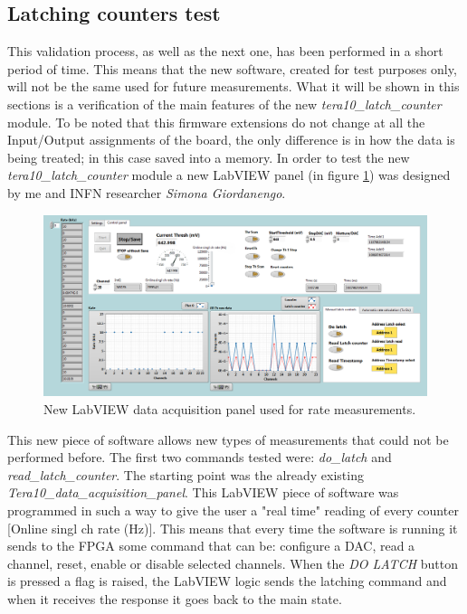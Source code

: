 \subsection{Latching counters test}\label{latchtests}
This validation process, as well as the next one, has been performed in a short period of time. This means that the new software, created for test purposes only, will not be the same used for future measurements. What it will be shown in this sections is a verification of the main features of the new \textit{tera10\_latch\_counter} module.
\newline
To be noted that this firmware extensions do not change at all the Input/Output assignments of the board, the only difference is in how the data is being treated; in this case saved into a memory.
In order to test the new \textit{tera10\_latch\_counter} module a new LabVIEW panel (in figure \ref{fig:newlabviewpanel}) was designed by me and INFN researcher \textit{Simona Giordanengo}.
\begin{figure}[H]
	\centering
	\includegraphics[width=0.99\linewidth]{IMG/ch5/latch_tests/fig1.PNG}
	\caption{New LabVIEW data acquisition panel used for rate measurements.}
	\label{fig:newlabviewpanel}
\end{figure}
\noindent This new piece of software allows new types of measurements that could not be performed before.
The first two commands tested were: \textit{do\_latch} and \textit{read\_latch\_counter}. The starting point was the already existing \textit{Tera10\_data\_acquisition\_panel}. This LabVIEW piece of software was programmed in such a way to give the user a "real time" reading of every counter [Online singl ch rate (Hz)].
This means that every time the software is running it sends to the FPGA some command that can be: configure a DAC, read a channel, reset, enable or disable selected channels.
When the \textit{DO LATCH} button is pressed a flag is raised, the LabVIEW logic sends the latching command and when it receives the response it goes back to the main state.
